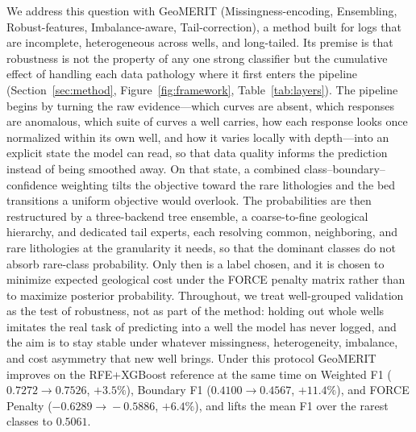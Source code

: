 \documentclass[bdcc,article,submit,pdftex,moreauthors]{Definitions/mdpi}
\begin{document}
We address this question with GeoMERIT (Missingness-encoding, Ensembling, Robust-features,
Imbalance-aware, Tail-correction), a method built for logs that are incomplete, heterogeneous
across wells, and long-tailed. Its premise is that robustness is not the property of any one
strong classifier but the cumulative effect of handling each data pathology where it first
enters the pipeline (Section~\ref{sec:method}, Figure~\ref{fig:framework},
Table~\ref{tab:layers}). The pipeline begins by turning the raw evidence---which curves are
absent, which responses are anomalous, which suite of curves a well carries, how each response
looks once normalized within its own well, and how it varies locally with depth---into an
explicit state the model can read, so that data quality informs the prediction instead of
being smoothed away. On that state, a combined class--boundary--confidence weighting tilts the
objective toward the rare lithologies and the bed transitions a uniform objective would
overlook. The probabilities are then restructured by a three-backend tree ensemble, a
coarse-to-fine geological hierarchy, and dedicated tail experts, each resolving common,
neighboring, and rare lithologies at the granularity it needs, so that the dominant classes do
not absorb rare-class probability. Only then is a label chosen, and it is chosen to minimize
expected geological cost under the FORCE penalty matrix rather than to maximize posterior
probability. Throughout, we treat well-grouped validation as the test of robustness, not as
part of the method: holding out whole wells imitates the real task of predicting into a well
the model has never logged, and the aim is to stay stable under whatever missingness,
heterogeneity, imbalance, and cost asymmetry that new well brings. Under this protocol
GeoMERIT improves on the RFE+XGBoost reference at the same time on Weighted F1
($0.7272\!\to\!0.7526$, $+3.5\%$), Boundary F1 ($0.4100\!\to\!0.4567$, $+11.4\%$), and FORCE
Penalty ($-0.6289\!\to\!-0.5886$, $+6.4\%$), and lifts the mean F1 over the rarest classes to
$0.5061$.
\end{document}
